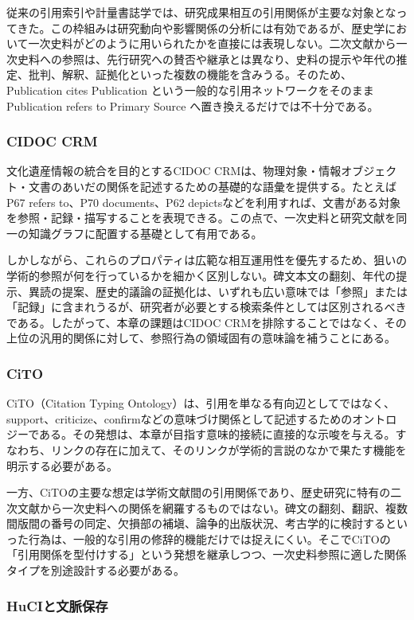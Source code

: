 従来の引用索引や計量書誌学では、研究成果相互の引用関係が主要な対象となってきた。この枠組みは研究動向や影響関係の分析には有効であるが、歴史学において一次史料がどのように用いられたかを直接には表現しない。二次文献から一次史料への参照は、先行研究への賛否や継承とは異なり、史料の提示や年代の推定、批判、解釈、証拠化といった複数の機能を含みうる。そのため、Publication cites Publication という一般的な引用ネットワークをそのまま Publication refers to Primary Source へ置き換えるだけでは不十分である。

\subsubsection{CIDOC CRM}

文化遺産情報の統合を目的とするCIDOC CRMは、物理対象・情報オブジェクト・文書のあいだの関係を記述するための基礎的な語彙を提供する。たとえばP67 refers to、P70 documents、P62 depictsなどを利用すれば、文書がある対象を参照・記録・描写することを表現できる。この点で、一次史料と研究文献を同一の知識グラフに配置する基礎として有用である。

しかしながら、これらのプロパティは広範な相互運用性を優先するため、狙いの学術的参照が何を行っているかを細かく区別しない。碑文本文の翻刻、年代の提示、異読の提案、歴史的議論の証拠化は、いずれも広い意味では「参照」または「記録」に含まれうるが、研究者が必要とする検索条件としては区別されるべきである。したがって、本章の課題はCIDOC CRMを排除することではなく、その上位の汎用的関係に対して、参照行為の領域固有の意味論を補うことにある。

\subsubsection{CiTO}

CiTO（Citation Typing Ontology）は、引用を単なる有向辺としてではなく、support、criticize、confirmなどの意味づけ関係として記述するためのオントロジーである。その発想は、本章が目指す意味的接続に直接的な示唆を与える。すなわち、リンクの存在に加えて、そのリンクが学術的言説のなかで果たす機能を明示する必要がある。

一方、CiTOの主要な想定は学術文献間の引用関係であり、歴史研究に特有の二次文献から一次史料への関係を網羅するものではない。碑文の翻刻、翻訳、複数間版間の番号の同定、欠損部の補塡、論争的出版状況、考古学的に検討するといった行為は、一般的な引用の修辞的機能だけでは捉えにくい。そこでCiTOの「引用関係を型付けする」という発想を継承しつつ、一次史料参照に適した関係タイプを別途設計する必要がある。

\subsubsection{HuCIと文脈保存}

